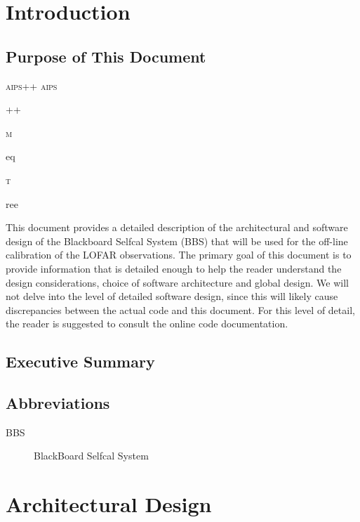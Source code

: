 \documentclass[10pt]{lofar}
\newcommand{\aips}{\textsc{aips}\begin{footnotesize}++\end{footnotesize}\xspace}
\newcommand{\meqtree}{\textsc{m}\begin{footnotesize}eq\end{footnotesize}\textsc{t}\begin{footnotesize}ree\end{footnotesize}\xspace}
\begin{document}
\maketitle
\newpage
%
\theDistributionList
\vspace{1cm}
\theDocumentRevision
\newpage
%
\begin{abstract}
\end{abstract}
\newpage
%
\tableofcontents
\newpage
%


\section{Introduction}
\label{sec:introduction}

\subsection{Purpose of This Document}
\label{subsec:purpose}
%
\textsc{aips++}
\aips
\meqtree
This document provides a detailed description of the architectural and
software design of the Blackboard Selfcal System (BBS) that will be used for
the off-line calibration of the LOFAR observations. The primary goal of this
document is to provide information that is detailed enough to help the reader
understand the design considerations, choice of software architecture and
global design. We will not delve into the level of detailed software design,
since this will likely cause discrepancies between the actual code and this
document. For this level of detail, the reader is suggested to consult the
online code documentation.

\subsection{Executive Summary}
\label{subsec:summary}

\subsection{Abbreviations}
\label{subsec:abbrev}
\begin{description}
\item [BBS] BlackBoard Selfcal System
\end{description}

\pagebreak

\section{Architectural Design}
\label{sec:architectural-design}
\end{document}
